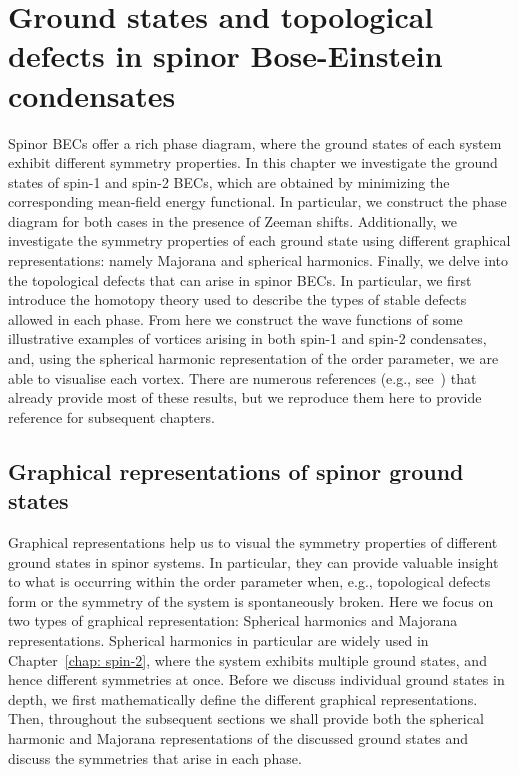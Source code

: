 \chapter[Ground states and topological defects in spinor Bose-Einstein
condensates][Ground states and topological defects]
{\label{chap: ground-states}
Ground states and topological defects in spinor Bose-Einstein condensates}
Spinor BECs offer a rich phase diagram, where the ground states of each system
exhibit different symmetry properties.
In this chapter we investigate the ground states of spin-1 and spin-2 BECs,
which are obtained by minimizing the corresponding mean-field energy functional.
In particular, we construct the phase diagram for both cases in the presence
of Zeeman shifts.
Additionally, we investigate the symmetry properties of each ground state
using different graphical representations: namely Majorana and spherical
harmonics.
Finally, we delve into the topological defects that can arise in spinor
BECs.
In particular, we first introduce the homotopy theory used to describe the
types of stable defects allowed in each phase.
From here we construct the wave functions of some illustrative examples of
vortices arising in both spin-1 and spin-2 condensates, and,
using the spherical harmonic representation of the order parameter, we are able
to visualise each vortex.
There are numerous references (e.g., see~\cite{Ciobanu2000, Zhang2003,
Kawaguchi2012,Stamper-Kurn2013}) that already provide most of these results,
but we reproduce them here to provide reference for subsequent chapters.

\section{Graphical representations of spinor ground states}
Graphical representations help us to visual the symmetry properties of different
ground states in spinor systems.
In particular, they can provide valuable insight to what is occurring within
the order parameter when, e.g., topological defects form or the symmetry of the
system is spontaneously broken.
Here we focus on two types of graphical representation: Spherical harmonics and
Majorana representations.
Spherical harmonics in particular are widely used in Chapter~\ref{chap: spin-2},
where the system exhibits multiple ground states, and hence different symmetries
at once.
Before we discuss individual ground states in depth, we first mathematically
define the different graphical representations.
Then, throughout the subsequent sections we shall provide both the spherical
harmonic and Majorana representations of the discussed ground states and
discuss the symmetries that arise in each phase.

